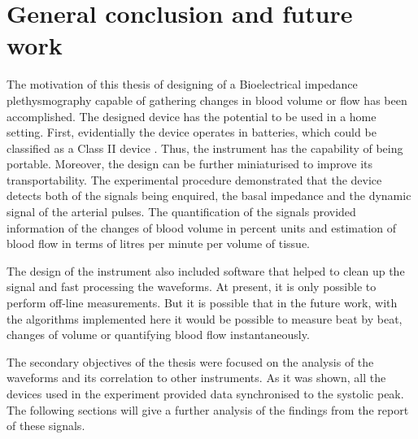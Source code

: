 
\chapter{General conclusion and future work}  %

\ifpdf
    \graphicspath{{Chapter11/Figs/Raster/}{Chapter11/Figs/PDF/}{Chapter11/Figs/}}
\else
    \graphicspath{{Chapter11/Figs/Vector/}{Chapter11/Figs/}}
\fi

The motivation of this thesis of designing of a Bioelectrical impedance plethysmography capable of gathering changes in blood volume or flow has been accomplished. The designed device has the potential to be used in a home setting. First, evidentially the device operates in batteries, which could be classified as a Class II device . Thus, the instrument has the capability of being portable. Moreover, the design can be further miniaturised to improve its transportability. The experimental procedure demonstrated that the device detects both of the signals being enquired, the basal impedance and the dynamic signal of the arterial pulses. The quantification of the signals provided information of the changes of blood volume in percent units and estimation of blood flow in terms of litres per minute per volume of tissue. 

The design of the instrument also included software that helped to clean up the signal and fast processing the waveforms. At present, it is only possible to perform off-line measurements. But it is possible that in the future work, with the algorithms implemented here it would be possible to measure beat by beat, changes of volume or quantifying blood flow instantaneously.

The secondary objectives of the thesis were focused on the analysis of the waveforms and its correlation to other instruments. As it was shown, all the devices used in the experiment provided data synchronised to the systolic peak. The following sections will give a further analysis of the findings from the report of these signals. 

